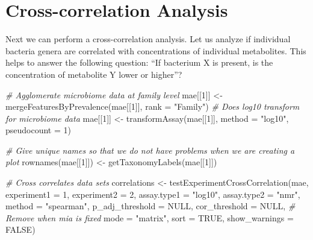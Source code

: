 \documentclass[
]{book}
\newenvironment{Shaded}{\begin{snugshade}}{\end{snugshade}}
\newcommand{\AttributeTok}[1]{\textcolor[rgb]{0.77,0.63,0.00}{#1}}
\newcommand{\CommentTok}[1]{\textcolor[rgb]{0.56,0.35,0.01}{\textit{#1}}}
\newcommand{\ConstantTok}[1]{\textcolor[rgb]{0.00,0.00,0.00}{#1}}
\newcommand{\DecValTok}[1]{\textcolor[rgb]{0.00,0.00,0.81}{#1}}
\newcommand{\FunctionTok}[1]{\textcolor[rgb]{0.00,0.00,0.00}{#1}}
\newcommand{\NormalTok}[1]{#1}
\newcommand{\OtherTok}[1]{\textcolor[rgb]{0.56,0.35,0.01}{#1}}
\newcommand{\StringTok}[1]{\textcolor[rgb]{0.31,0.60,0.02}{#1}}
\begin{document}
\hypertarget{cross-correlation}{%
\section{Cross-correlation Analysis}\label{cross-correlation}}

Next we can perform a cross-correlation analysis. Let us analyze if
individual bacteria genera are correlated with concentrations of
individual metabolites. This helps to answer the following question: ``If
bacterium X is present, is the concentration of metabolite Y lower or higher''?

\begin{Shaded}
\begin{Highlighting}[]
\CommentTok{\# Agglomerate microbiome data at family level}
\NormalTok{mae[[}\DecValTok{1}\NormalTok{]] }\OtherTok{\textless{}{-}} \FunctionTok{mergeFeaturesByPrevalence}\NormalTok{(mae[[}\DecValTok{1}\NormalTok{]], }\AttributeTok{rank =} \StringTok{"Family"}\NormalTok{)}
\CommentTok{\# Does log10 transform for microbiome data}
\NormalTok{mae[[}\DecValTok{1}\NormalTok{]] }\OtherTok{\textless{}{-}} \FunctionTok{transformAssay}\NormalTok{(mae[[}\DecValTok{1}\NormalTok{]], }\AttributeTok{method =} \StringTok{"log10"}\NormalTok{, }\AttributeTok{pseudocount =} \DecValTok{1}\NormalTok{)}

\CommentTok{\# Give unique names so that we do not have problems when we are creating a plot}
\FunctionTok{rownames}\NormalTok{(mae[[}\DecValTok{1}\NormalTok{]]) }\OtherTok{\textless{}{-}} \FunctionTok{getTaxonomyLabels}\NormalTok{(mae[[}\DecValTok{1}\NormalTok{]])}

\CommentTok{\# Cross correlates data sets}
\NormalTok{correlations }\OtherTok{\textless{}{-}} \FunctionTok{testExperimentCrossCorrelation}\NormalTok{(mae, }
                                               \AttributeTok{experiment1 =} \DecValTok{1}\NormalTok{,}
                                               \AttributeTok{experiment2 =} \DecValTok{2}\NormalTok{,}
                                               \AttributeTok{assay.type1 =} \StringTok{"log10"}\NormalTok{, }
                                               \AttributeTok{assay.type2 =} \StringTok{"nmr"}\NormalTok{,}
                                               \AttributeTok{method =} \StringTok{"spearman"}\NormalTok{, }
                                               \AttributeTok{p\_adj\_threshold =} \ConstantTok{NULL}\NormalTok{,}
                                               \AttributeTok{cor\_threshold =} \ConstantTok{NULL}\NormalTok{,}
                                               \CommentTok{\# Remove when mia is fixed}
                                               \AttributeTok{mode =} \StringTok{"matrix"}\NormalTok{,}
                                               \AttributeTok{sort =} \ConstantTok{TRUE}\NormalTok{,}
                                               \AttributeTok{show\_warnings =} \ConstantTok{FALSE}\NormalTok{)}
\end{Highlighting}
\end{Shaded}
\end{document}
